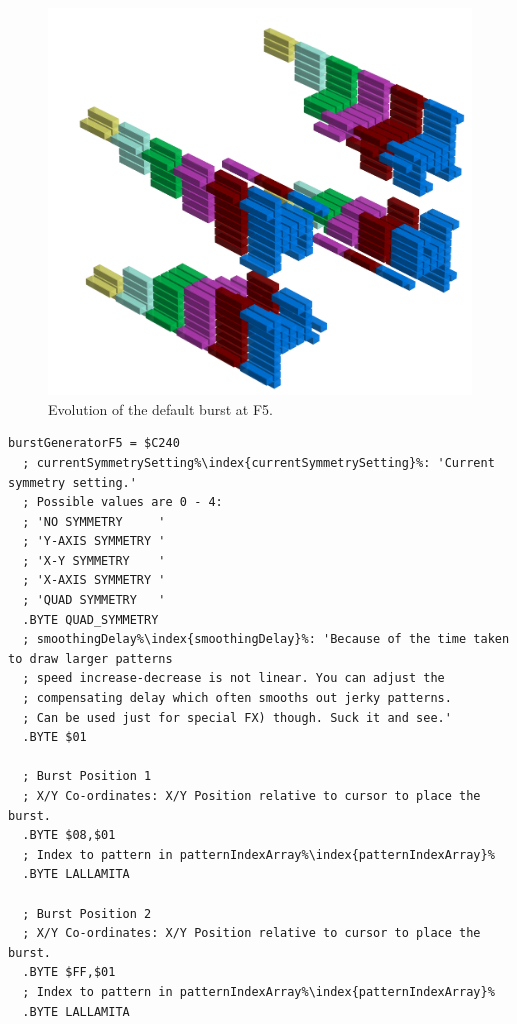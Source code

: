 \clearpage

\clearpage
\begin{figure}[H]
    \centering
    \begin{adjustbox}{width=17cm,center}
      \includegraphics[width=12cm]{src/patterns/bursts/pattern2-45.png}%
    \end{adjustbox}
\caption{Evolution of the default burst at F5.}
\end{figure}
\clearpage

\begin{lstlisting}[caption=Source code for the F5 Burst.,escapechar=\%]
burstGeneratorF5 = $C240
  ; currentSymmetrySetting%\index{currentSymmetrySetting}%: 'Current symmetry setting.'
  ; Possible values are 0 - 4:
  ; 'NO SYMMETRY     '
  ; 'Y-AXIS SYMMETRY '
  ; 'X-Y SYMMETRY    '
  ; 'X-AXIS SYMMETRY '
  ; 'QUAD SYMMETRY   '
  .BYTE QUAD_SYMMETRY
  ; smoothingDelay%\index{smoothingDelay}%: 'Because of the time taken to draw larger patterns
  ; speed increase-decrease is not linear. You can adjust the 
  ; compensating delay which often smooths out jerky patterns. 
  ; Can be used just for special FX) though. Suck it and see.'
  .BYTE $01

  ; Burst Position 1  
  ; X/Y Co-ordinates: X/Y Position relative to cursor to place the burst.
  .BYTE $08,$01
  ; Index to pattern in patternIndexArray%\index{patternIndexArray}%
  .BYTE LALLAMITA

  ; Burst Position 2
  ; X/Y Co-ordinates: X/Y Position relative to cursor to place the burst.
  .BYTE $FF,$01
  ; Index to pattern in patternIndexArray%\index{patternIndexArray}%
  .BYTE LALLAMITA

\end{lstlisting}

